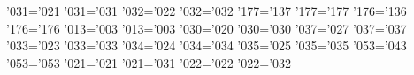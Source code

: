 \uccode'031='021 \lccode'031='031 %
\uccode'032='022 \lccode'032='032 %
\uccode'177='137 \lccode'177='177 %
\uccode'176='136 \lccode'176='176 %
\uccode'013='003 \lccode'013='003 %
\uccode'030='020 \lccode'030='030 %
\uccode'037='027 \lccode'037='037 %
\uccode'033='023 \lccode'033='033 %
\uccode'034='024 \lccode'034='034 %
\uccode'035='025 \lccode'035='035 %
\uccode'053='043 \lccode'053='053 %
\uccode'021='021 \lccode'021='031 %
\uccode'022='022 \lccode'022='032 %
